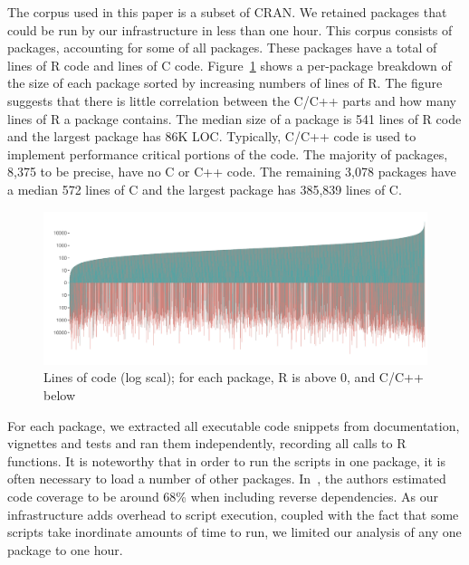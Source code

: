 \documentclass[acmsmall,10pt,review,anonymous]{acmart}\settopmatter{printfolios=true,printccs=false,printacmref=false}
\begin{document}
The corpus used in this paper is a subset of CRAN. We retained packages that
could be run by our infrastructure in less than one hour. This corpus
consists of \PACKAGES packages, accounting for some \PERCENTCRAN of all
packages.  These packages have a total of \RLOC lines of R code and \CLOC
lines of C code. Figure~\ref{allcloc} shows a per-package breakdown of the
size of each package sorted by increasing numbers of lines of R. The figure
suggests that there is little correlation between the C/C++ parts and how
many lines of R a package contains. The median size of a package is 541
lines of R code and the largest package has 86K LOC. Typically, C/C++ code
is used to implement performance critical portions of the code. The majority
of packages, 8,375 to be precise, have no C or C++ code.  The remaining 3,078
packages have a median 572 lines of C and the largest package has 385,839
lines of C.

\begin{figure}[!b]\begin{center}
\includegraphics[width=.9\textwidth]{linesofrandccode}
\caption{Lines of code (log scal); for each package, R is above 0, and C/C++
  below}\label{allcloc}\end{center}
\end{figure}


For each package, we extracted all executable code snippets from
documentation, vignettes and tests and ran them independently, recording all
calls to R functions.  It is noteworthy that in order to run the scripts in
one package, it is often necessary to load a number of other packages.
In~\cite{issta18}, the authors estimated code coverage to be around 68\%
when including reverse dependencies.  As our infrastructure adds overhead to
script execution, coupled with the fact that some scripts take inordinate
amounts of time to run, we limited our analysis of any one
package to one hour.
\end{document}

